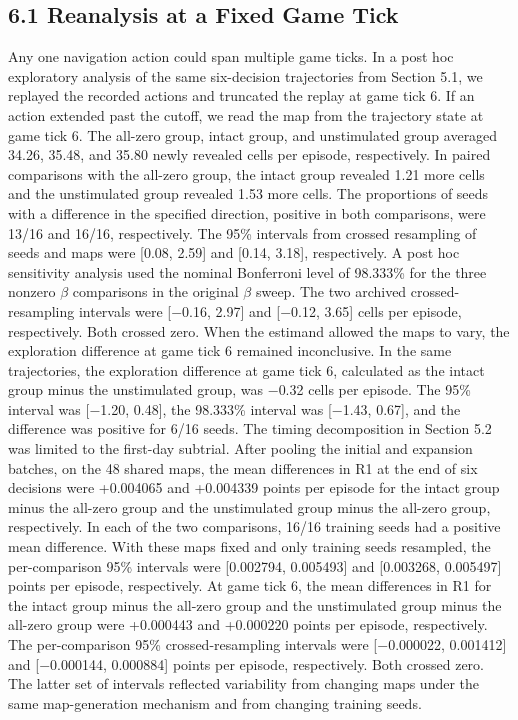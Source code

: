 \documentclass{article}
\begin{document}
\subsection*{6.1 Reanalysis at a Fixed Game Tick}


Any one navigation action could span multiple game ticks. In a post hoc exploratory analysis of the same six-decision trajectories from Section 5.1, we replayed the recorded actions and truncated the replay at game tick 6. If an action extended past the cutoff, we read the map from the trajectory state at game tick 6. The all-zero group, intact group, and unstimulated group averaged 34.26, 35.48, and 35.80 newly revealed cells per episode, respectively. In paired comparisons with the all-zero group, the intact group revealed 1.21 more cells and the unstimulated group revealed 1.53 more cells. The proportions of seeds with a difference in the specified direction, positive in both comparisons, were 13/16 and 16/16, respectively. The 95\% intervals from crossed resampling of seeds and maps were [0.08, 2.59] and [0.14, 3.18], respectively. A post hoc sensitivity analysis used the nominal Bonferroni level of 98.333\% for the three nonzero \ensuremath{\beta} comparisons in the original \ensuremath{\beta} sweep. The two archived crossed-resampling intervals were [\ensuremath{-}0.16, 2.97] and [\ensuremath{-}0.12, 3.65] cells per episode, respectively. Both crossed zero. When the estimand allowed the maps to vary, the exploration difference at game tick 6 remained inconclusive. In the same trajectories, the exploration difference at game tick 6, calculated as the intact group minus the unstimulated group, was \ensuremath{-}0.32 cells per episode. The 95\% interval was [\ensuremath{-}1.20, 0.48], the 98.333\% interval was [\ensuremath{-}1.43, 0.67], and the difference was positive for 6/16 seeds. The timing decomposition in Section 5.2 was limited to the first-day subtrial. After pooling the initial and expansion batches, on the 48 shared maps, the mean differences in R1 at the end of six decisions were +0.004065 and +0.004339 points per episode for the intact group minus the all-zero group and the unstimulated group minus the all-zero group, respectively. In each of the two comparisons, 16/16 training seeds had a positive mean difference. With these maps fixed and only training seeds resampled, the per-comparison 95\% intervals were [0.002794, 0.005493] and [0.003268, 0.005497] points per episode, respectively. At game tick 6, the mean differences in R1 for the intact group minus the all-zero group and the unstimulated group minus the all-zero group were +0.000443 and +0.000220 points per episode, respectively. The per-comparison 95\% crossed-resampling intervals were [\ensuremath{-}0.000022, 0.001412] and [\ensuremath{-}0.000144, 0.000884] points per episode, respectively. Both crossed zero. The latter set of intervals reflected variability from changing maps under the same map-generation mechanism and from changing training seeds.
\end{document}
